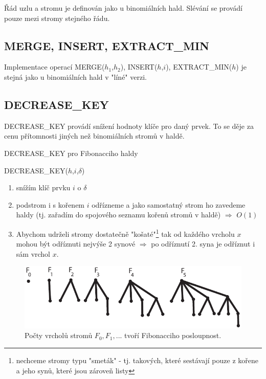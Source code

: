 Řád uzlu a stromu je definován jako u binomiálních hald. Slévání se
provádí pouze mezi stromy stejného řádu.

\subsection{MERGE, INSERT, EXTRACT\_MIN}

Implementace operací MERGE($h_1$,$h_2$), INSERT($h$,$i$), EXTRACT\_MIN($h$) 
je stejná jako u binomiálních hald v "líné" verzi.

\subsection{DECREASE\_KEY}

DECREASE\_KEY provádí snížení hodnoty klíče pro daný prvek. To se děje za
cenu přítomnosti jiných než binomiálních stromů v haldě.

\begin{algorithm}[!htb]
\caption{DECREASE\_KEY pro Fibonacciho haldy}
\label{alg:heap.fib.decrease_key}
DECREASE\_KEY($h$,$i$,$\delta$)
\begin{enumerate}
  \item snížím klíč prvku $i$ o $\delta$
  \item podstrom i s kořenem $i$ odřízneme a jako samostatný strom ho
        zavedeme haldy (tj. zařadím do spojového seznamu kořenů stromů v
	haldě) $\Rightarrow$ $O(1)$
  \item Abychom udrželi stromy dostatečně "košaté"\footnote{nechceme 
  	stromy typu "smeták" - tj. takových, které sestávají pouze 
	z kořene a jeho synů, které jsou zároveň listy}
  	tak od každého vrcholu $x$ mohou být odříznuti nejvýše 2
  	synové $\Rightarrow$ po odříznutí 2. syna je odříznut i sám vrchol $x$.
\end{enumerate}
\end{algorithm}

\begin{figure} 
\centering\includegraphics{pics/fibheaps}
\caption{Počty vrcholů stromů $F_0, F_1, ...$ tvoří Fibonacciho
posloupnost.}
\label{fig:heaps.fib.pocty.vrcholu}
\end{figure}

